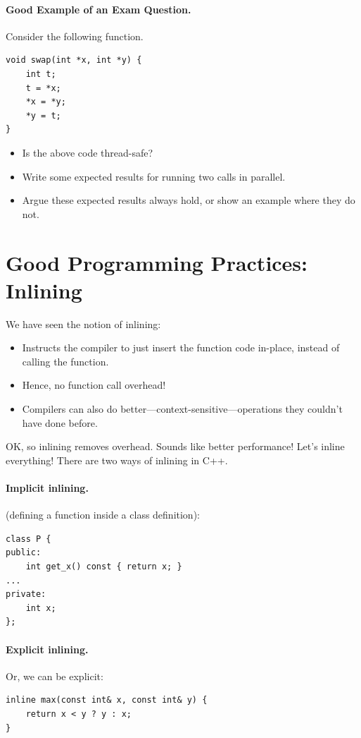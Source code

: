 \documentclass[11pt]{article}
\newenvironment{itemizep}{
 \begin{itemize}
  \setlength{\itemsep}{0pt}
  \setlength{\parsep}{3pt}
  \setlength{\topsep}{3pt}
  \setlength{\partopsep}{0pt}
  \setlength{\leftmargin}{1.5em}
  \setlength{\labelwidth}{1em}
  \setlength{\labelsep}{0.5em} }
 {\end{itemize}}
\begin{document}
\paragraph{Good Example of an Exam Question.} Consider the following function.

  \begin{lstlisting}
void swap(int *x, int *y) {
    int t;
    t = *x;
    *x = *y;
    *y = t;
}  
  \end{lstlisting}

  \begin{itemizep}
    \item Is the above code thread-safe?
    \item Write some expected results for running two calls in parallel.
    \item Argue these expected results always hold, or show an example where
      they do not.
  \end{itemizep}

\section*{Good Programming Practices: Inlining}
We have seen the notion of inlining:
  \begin{itemizep}
    \item Instructs the compiler to just insert the function code in-place,
      instead of calling the function.
    \item Hence, no function call overhead!
    \item Compilers can also do better---context-sensitive---operations they couldn't
      have done before.
  \end{itemizep}

OK, so inlining removes overhead. Sounds like better performance! Let's inline everything!
There are two ways of inlining in C++.

\paragraph{Implicit inlining.} (defining a function inside a class definition):
  \begin{lstlisting}
class P {
public:
    int get_x() const { return x; }
...
private:
    int x;
};
  \end{lstlisting}

\paragraph{Explicit inlining.} Or, we can be explicit:
  \begin{lstlisting}
inline max(const int& x, const int& y) {
    return x < y ? y : x;
}
  \end{lstlisting}
\end{document}
